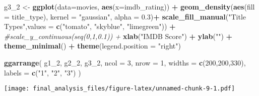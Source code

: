\documentclass[]{article}
\newenvironment{Shaded}{\begin{snugshade}}{\end{snugshade}}
\newcommand{\KeywordTok}[1]{\textcolor[rgb]{0.13,0.29,0.53}{\textbf{#1}}}
\newcommand{\DataTypeTok}[1]{\textcolor[rgb]{0.13,0.29,0.53}{#1}}
\newcommand{\DecValTok}[1]{\textcolor[rgb]{0.00,0.00,0.81}{#1}}
\newcommand{\FloatTok}[1]{\textcolor[rgb]{0.00,0.00,0.81}{#1}}
\newcommand{\StringTok}[1]{\textcolor[rgb]{0.31,0.60,0.02}{#1}}
\newcommand{\CommentTok}[1]{\textcolor[rgb]{0.56,0.35,0.01}{\textit{#1}}}
\newcommand{\OperatorTok}[1]{\textcolor[rgb]{0.81,0.36,0.00}{\textbf{#1}}}
\newcommand{\NormalTok}[1]{#1}
\begin{document}
\begin{Shaded}
\begin{Highlighting}[]
\NormalTok{g3_}\DecValTok{2}\NormalTok{ <-}\StringTok{ }\KeywordTok{ggplot}\NormalTok{(}\DataTypeTok{data=}\NormalTok{movies, }\KeywordTok{aes}\NormalTok{(}\DataTypeTok{x=}\NormalTok{imdb_rating)) }\OperatorTok{+}
\StringTok{  }\KeywordTok{geom_density}\NormalTok{(}\KeywordTok{aes}\NormalTok{(}\DataTypeTok{fill =}\NormalTok{ title_type), }\DataTypeTok{kernel =} \StringTok{"gaussian"}\NormalTok{, }\DataTypeTok{alpha =} \FloatTok{0.3}\NormalTok{)}\OperatorTok{+}
\StringTok{  }\KeywordTok{scale_fill_manual}\NormalTok{(}\StringTok{"Title Types"}\NormalTok{,}\DataTypeTok{values =} \KeywordTok{c}\NormalTok{(}\StringTok{"tomato"}\NormalTok{, }\StringTok{"skyblue"}\NormalTok{, }\StringTok{"limegreen"}\NormalTok{)) }\OperatorTok{+}\StringTok{ }
\StringTok{  }\CommentTok{#scale_y_continuous(seq(0,1,0.1)) +}
\StringTok{  }\KeywordTok{xlab}\NormalTok{(}\StringTok{"IMDB Score"}\NormalTok{) }\OperatorTok{+}
\StringTok{  }\KeywordTok{ylab}\NormalTok{(}\StringTok{""}\NormalTok{) }\OperatorTok{+}
\StringTok{  }\KeywordTok{theme_minimal}\NormalTok{() }\OperatorTok{+}
\StringTok{  }\KeywordTok{theme}\NormalTok{(}\DataTypeTok{legend.position =} \StringTok{"right"}\NormalTok{)}

\KeywordTok{ggarrange}\NormalTok{(}
\NormalTok{    g1_}\DecValTok{2}\NormalTok{,}
\NormalTok{    g2_}\DecValTok{2}\NormalTok{,}
\NormalTok{    g3_}\DecValTok{2}\NormalTok{,}
    \DataTypeTok{ncol =} \DecValTok{3}\NormalTok{,}
    \DataTypeTok{nrow =} \DecValTok{1}\NormalTok{,}
    \DataTypeTok{widths =} \KeywordTok{c}\NormalTok{(}\DecValTok{200}\NormalTok{,}\DecValTok{200}\NormalTok{,}\DecValTok{330}\NormalTok{),}
    \DataTypeTok{labels =} \KeywordTok{c}\NormalTok{(}\StringTok{"1"}\NormalTok{, }\StringTok{"2"}\NormalTok{, }\StringTok{"3"}\NormalTok{)}
\NormalTok{  )}
\end{Highlighting}
\end{Shaded}

\texttt{[image: final\_analysis\_files/figure-latex/unnamed-chunk-9-1.pdf]}
\end{document}
